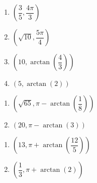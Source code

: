 \documentclass{ximera}
\begin{document}
\begin{multicols}{4}

\begin{enumerate}

\setcounter{enumi}{\value{HW}}

\item $\left( \dfrac{3}{5}, \dfrac{4\pi}{3} \right)$
\item $\left( \sqrt{10}, \dfrac{5\pi}{4} \right)$
\item  $\left( 10, \arctan\left(\dfrac{4}{3}\right) \right)$
\item  $\left( 5, \arctan\left(2\right) \right)$ 

\setcounter{HW}{\value{enumi}}

\end{enumerate}

\end{multicols}

\begin{multicols}{2}

\begin{enumerate}

\setcounter{enumi}{\value{HW}}

\item $\left( \sqrt{65}, \pi - \arctan\left(\dfrac{1}{8}\right)\right)$
\item  $(20, \pi - \arctan(3))$ 

\setcounter{HW}{\value{enumi}}

\end{enumerate}

\end{multicols}

\begin{multicols}{2}

\begin{enumerate}

\setcounter{enumi}{\value{HW}}

\item  $\left(13, \pi + \arctan\left(\dfrac{12}{5}\right) \right)$
\item  $\left(\dfrac{1}{3}, \pi + \arctan\left(2\right) \right)$ 

\setcounter{HW}{\value{enumi}}

\end{enumerate}

\end{multicols}
\end{document}
